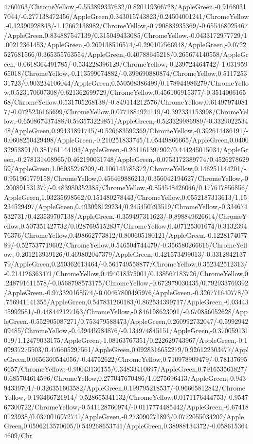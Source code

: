 {\begin{tikzternal}
4760763/ChromeYellow,-0.553899337632/0.820119366728/AppleGreen,-0.91680317044/-0.277138472456/AppleGreen,0.343015743823/0.24504001241/ChromeYellow,-0.12390928848/-1.12662138982/ChromeYellow,-0.790883935369/-0.655468025467/AppleGreen,0.834887547139/0.315049433085/ChromeYellow,-0.0433172977729/1.00212361453/AppleGreen,-0.269138516574/-0.290107566948/AppleGreen,-0.0722527681566/0.365355763554/AppleGreen,-0.40788645218/0.265674140558/AppleGreen,-0.0618364491785/-0.534228396129/ChromeYellow,-0.239724464742/-1.03195965018/ChromeYellow,-0.113599074882/-0.399690880874/ChromeYellow,0.511725331723/0.903234106044/AppleGreen,0.550508386499/0.178944986279/ChromeYellow,0.523170607308/0.621362699729/ChromeYellow,0.456106915377/-0.351400616568/ChromeYellow,0.531705268138/-0.849114212576/ChromeYellow,0.614979740817/-0.0725236165699/ChromeYellow,0.0771884924119/-0.392331153998/ChromeYellow,-0.650867437488/0.593573229851/AppleGreen,-0.523329986989/-0.332902253448/AppleGreen,0.99131891715/-0.526683592369/ChromeYellow,-0.392614486191/-0.0608250429498/AppleGreen,-0.210251833745/1.05449866665/AppleGreen,0.040032953891/0.381761144193/AppleGreen,-0.231161397902/0.444245015034/AppleGreen,-0.278131408965/0.462190031748/AppleGreen,-0.0753172389774/0.452627862959/AppleGreen,1.06035276209/-0.106143785372/ChromeYellow,0.146251144201/-0.951961779158/ChromeYellow,0.456469886213/0.356042194627/ChromeYellow,-0.200891531377/-0.483980352385/ChromeYellow,-0.854548426046/0.177617856856/AppleGreen,1.03235698562/0.151480278443/ChromeYellow,0.0552187313613/1.15234529497/AppleGreen,0.493098129234/0.245450793519/ChromeYellow,-0.334674532731/0.423539707138/AppleGreen,-0.359497311623/-0.898849626614/ChromeYellow,0.507351427732/0.0287695152837/ChromeYellow,0.407125301674/0.313239476376/ChromeYellow,0.498662773812/0.800605180121/AppleGreen,-0.122817407789/-0.527537719602/ChromeYellow,0.546504744479/-0.356580266616/ChromeYellow,-0.201213939126/0.469802047379/AppleGreen,-0.421573499013/-0.331284213779/AppleGreen,0.250362613464/-0.561749558877/ChromeYellow,0.352342512313/-0.214126363471/ChromeYellow,0.494018375001/0.138567183726/ChromeYellow,0.248791611578/-0.0568798573175/ChromeYellow,-0.672979030435/0.792933769392/AppleGreen,-0.973320168574/-0.00467800495976/AppleGreen,-0.326771640778/0.756941141355/AppleGreen,0.547831260183/0.862534399717/AppleGreen,-0.0344345992581/-0.448442127163/ChromeYellow,-0.846198623091/-0.670856052628/AppleGreen,-0.552905087271/0.753479588473/AppleGreen,0.260992732047/-0.599294209485/ChromeYellow,-0.439445984876/-0.134974845151/AppleGreen,-0.370059131019/1.12479033175/AppleGreen,-1.08163767351/0.222629743967/AppleGreen,-0.109937275503/0.476605297561/AppleGreen,0.0928316652279/0.926122303477/AppleGreen,0.0656360544056/-0.44752622/ChromeYellow,0.710978909479/-0.781376956657/ChromeYellow,-0.90043136155/0.34833410697/AppleGreen,0.791653563827/0.685704614596/ChromeYellow,0.277047670486/1.0275696413/AppleGreen,-0.94394339701/-0.326351603582/AppleGreen,0.199795218537/-0.96605812842/ChromeYellow,-0.193466721914/-0.528655341132/ChromeYellow,0.0171176444753/-0.954767300722/ChromeYellow,-0.541128760974/-0.0117774485442/AppleGreen,-0.674180123938/0.0370016972741/AppleGreen,-0.273090271893/0.0772055034202/AppleGreen,0.0596213570605/0.549268653741/AppleGreen,0.38988134372/-0.0586153644609/Chr
\end{tikzternal}}
